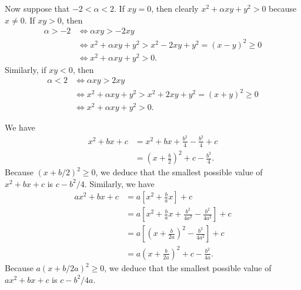 Now suppose that $-2 < \alpha < 2$. If $x y = 0$, then clearly $x^2 + \alpha x y + y^2 > 0$ because $x \neq 0$. If $x y > 0$, then
\begin{align*}
	\alpha > -2 & \iff \alpha x y > -2 x y                                           \\
	            & \iff x^2 + \alpha x y + y^2 > x^2 - 2 x y + y^2 = (x - y)^2 \geq 0 \\
	            & \iff x^2 + \alpha x y + y^2 > 0.
\end{align*}
Similarly, if $x y < 0$, then
\begin{align*}
	\alpha < 2 & \iff \alpha x y > 2 x y                                            \\
	           & \iff x^2 + \alpha x y + y^2 > x^2 + 2 x y + y^2 = (x + y)^2 \geq 0 \\
	           & \iff x^2 + \alpha x y + y^2 > 0.
\end{align*}


We have
\begin{align*}
	x^2 + b x + c & = x^2 + b x + \frac{b^2}{4} - \frac{b^2}{4} + c         \\
	              & = \left( x + \frac{b}{2} \right)^2 + c - \frac{b^2}{4}.
\end{align*}
Because $(x + b / 2)^2 \geq 0$, we deduce that the smallest possible value of $x^2 + b x + c$ is $c - b^2 / 4$. Similarly, we have
\begin{align*}
	a x^2 + b x + c & = a \left[ x^2 + \frac{b}{a} x \right] + c                                         \\
	                & = a \left[ x^2 + \frac{b}{a} x + \frac{b^2}{4 a^2} - \frac{b^2}{4 a^2} \right] + c \\
	                & = a \left[ \left( x + \frac{b}{2 a} \right)^2 - \frac{b^2}{4 a^2} \right] + c      \\
	                & = a \left( x + \frac{b}{2 a} \right)^2 + c - \frac{b^2}{4 a}.
\end{align*}
Because $a(x + b / 2 a)^2 \geq 0$, we deduce that the smallest possible value of $a x^2 + b x + c$ is $c - b^2 / 4 a$.


